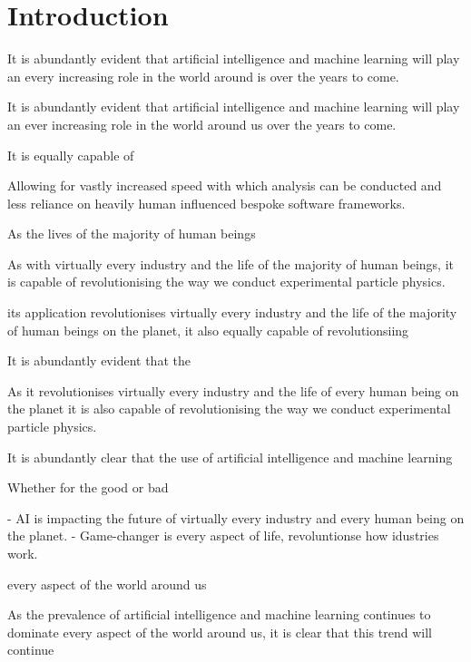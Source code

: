 \chapter{Introduction} %
\label{chap:introduction} %
\setcounter{page}{17}  %

It is abundantly evident that artificial intelligence and machine learning will play an every
increasing role in the world around is over the years to come. 

It is abundantly evident that artificial intelligence and machine learning will play an ever
increasing role in the world around us over the years to come. 


It is equally capable of 


Allowing for vastly increased speed with which analysis can be conducted and less reliance on
heavily human influenced bespoke software frameworks.

As the lives of the majority of human beings 


As with virtually every industry
and the life of the majority of human beings, it is capable of revolutionising the way we conduct
experimental particle physics.


its application revolutionises virtually every industry
and the life of the majority of human beings on the planet, it also equally capable of
revolutionsiing 

It is abundantly evident that the 

As it revolutionises virtually every industry and the life of every human being on the planet it
is also capable of revolutionising the way we conduct experimental particle physics. 

It is abundantly clear that the use of artificial intelligence and machine learning 

Whether for the good or bad

- AI is impacting the future of virtually every industry and every human being on the planet. 
- Game-changer is every aspect of life, revoluntionse how idustries work.

every aspect of the world around us

As the prevalence of artificial intelligence and machine learning continues to dominate every
aspect of the world around us, it is clear that this trend will continue 

